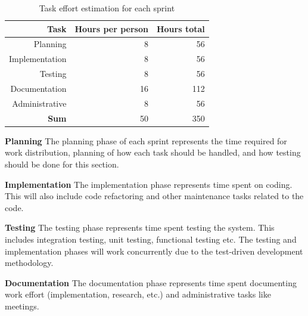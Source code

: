 \begin{table}[htbp]
\begin{center}
  \begin{tabular}{|r|r|r|}
    \hline
    \bf{Task} & \bf{Hours per person} & \bf{Hours total} \\
    \hline
    Planning & 8 & 56 \\
    Implementation & 8 & 56 \\
    Testing & 8 & 56 \\
    Documentation & 16 & 112 \\
    Administrative & 8 & 56 \\
    \hline \hline
    \bf{Sum} & 50 & 350 \\
    \hline
  \end{tabular}
  \caption{Task effort estimation for each sprint}
  \label{Sprint effort estimation}
\end{center}
\end{table}

\textbf{Planning} The planning phase of each sprint represents the time
required for work distribution, planning of how each task should be handled,
and how testing should be done for this section.

\textbf{Implementation} The implementation phase represents time spent on coding.
This will also include code refactoring and other maintenance tasks
related to the code.

\textbf{Testing} The testing phase represents time spent testing the system.
This includes integration testing, unit testing, functional testing etc.
The testing and implementation phases will work concurrently due to the
test-driven development methodology.

\textbf{Documentation} The documentation phase represents time spent
documenting work effort (implementation, research, etc.) and administrative
tasks like meetings.
